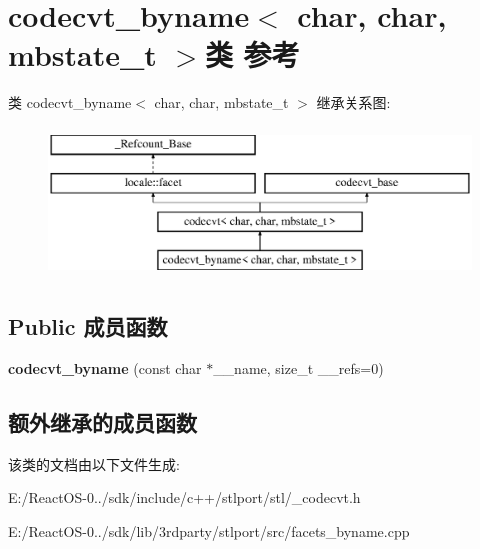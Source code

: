 \hypertarget{classcodecvt__byname_3_01char_00_01char_00_01mbstate__t_01_4}{}\section{codecvt\+\_\+byname$<$ char, char, mbstate\+\_\+t $>$类 参考}
\label{classcodecvt__byname_3_01char_00_01char_00_01mbstate__t_01_4}
类 codecvt\+\_\+byname$<$ char, char, mbstate\+\_\+t $>$ 继承关系图\+:\begin{figure}[H]
\begin{center}
\leavevmode
\includegraphics[height=4.000000cm]{classcodecvt__byname_3_01char_00_01char_00_01mbstate__t_01_4}
\end{center}
\end{figure}
\subsection*{Public 成员函数}
\begin{DoxyCompactItemize}
\item 
\mbox{\label{classcodecvt__byname_3_01char_00_01char_00_01mbstate__t_01_4_aabe0732c8106fff1062a5fbbb2c48966}} 
{\bfseries codecvt\+\_\+byname} (const char $\ast$\+\_\+\+\_\+name, size\+\_\+t \+\_\+\+\_\+refs=0)
\end{DoxyCompactItemize}
\subsection*{额外继承的成员函数}


该类的文档由以下文件生成\+:\begin{DoxyCompactItemize}
\item 
E\+:/\+React\+O\+S-\/0../sdk/include/c++/stlport/stl/\+\_\+codecvt.\+h\item 
E\+:/\+React\+O\+S-\/0../sdk/lib/3rdparty/stlport/src/facets\+\_\+byname.\+cpp\end{DoxyCompactItemize}
